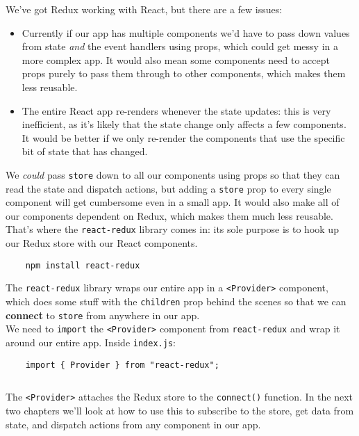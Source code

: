 We've got Redux working with React, but there are a few issues:

\begin{itemize}
    \item Currently if our app has multiple components we'd have to pass down values from state \textit{and} the event handlers using props, which could get messy in a more complex app. It would also mean some components need to accept props purely to pass them through to other components, which makes them less reusable.
    \item The entire React app re-renders whenever the state updates: this is very inefficient, as it's likely that the state change only affects a few components. It would be better if we only re-render the components that use the specific bit of state that has changed.
\end{itemize}

We \textit{could} pass \texttt{store} down to all our components using props so that they can read the state and dispatch actions, but adding a \texttt{store} prop to every single component will get cumbersome even in a small app. It would also make all of our components dependent on Redux, which makes them much less reusable.
\\

That's where the \texttt{react-redux} library comes in: its sole purpose is to hook up our Redux store with our React components.

\begin{verbatim}
    npm install react-redux
\end{verbatim}

The \texttt{react-redux} library wraps our entire app in a \texttt{<Provider>} component, which does some stuff with the \texttt{children} prop behind the scenes so that we can \textbf{connect} to \texttt{store} from anywhere in our app.
\\

We need to \texttt{import} the \texttt{<Provider>} component from \texttt{react-redux} and wrap it around our entire app. Inside \texttt{index.js}:

\begin{verbatim}
    import { Provider } from "react-redux";
\end{verbatim}

\inputminted{jsx}{02/figures/01/01-index.js}

The \texttt{<Provider>} attaches the Redux store to the \texttt{connect()} function. In the next two chapters we'll look at how to use this to subscribe to the store, get data from state, and dispatch actions from any component in our app.
\\

